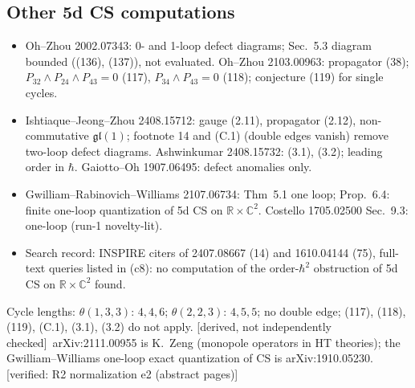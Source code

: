 \documentclass[10pt,a4paper]{article}
\numberwithin{equation}{section}
\theoremstyle{definition}
\theoremstyle{remark}
\newcommand{\fgl}{\mathfrak{gl}}
\newcommand{\ver}[1]{\textup{[verified: #1]}}
\newcommand{\der}{\textup{[derived, not independently checked]}}
\begin{document}
\subsection{Other 5d CS computations}
\begin{itemize}\itemsep1pt
\item Oh--Zhou 2002.07343: 0- and 1-loop defect diagrams; Sec.~5.3 diagram bounded ((136), (137)), not evaluated. Oh--Zhou 2103.00963: propagator (38); $P_{32}\wedge P_{24}\wedge P_{43}=0$ (117), $P_{34}\wedge P_{43}=0$ (118); conjecture (119) for single cycles.
\item Ishtiaque--Jeong--Zhou 2408.15712: gauge (2.11), propagator (2.12), non-commutative $\fgl(1)$; footnote 14 and (C.1) (double edges vanish) remove two-loop defect diagrams. Ashwinkumar 2408.15732: (3.1), (3.2); leading order in $\hbar$. Gaiotto--Oh 1907.06495: defect anomalies only.
\item Gwilliam--Rabinovich--Williams 2107.06734: Thm~5.1 one loop; Prop.~6.4: finite one-loop quantization of 5d CS on $\mathbb R\times\mathbb C^2$. Costello 1705.02500 Sec.~9.3: one-loop (run-1 novelty-lit).
\item Search record: INSPIRE citers of 2407.08667 (14) and 1610.04144 (75), full-text queries listed in  (c8): no computation of the order-$\hbar^2$ obstruction of 5d CS on $\mathbb R\times\mathbb C^2$ found.
\end{itemize}
Cycle lengths: $\theta(1,3,3)$: $4,4,6$; $\theta(2,2,3)$: $4,5,5$; no double edge; (117), (118), (119), (C.1), (3.1), (3.2) do not apply. \der\
arXiv:2111.00955 is K.~Zeng (monopole operators in HT theories); the Gwilliam--Williams one-loop exact quantization of CS is arXiv:1910.05230. \ver{R2 normalization e2 (abstract pages)}
\end{document}
